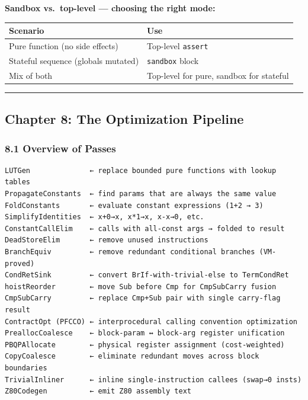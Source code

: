 \documentclass[
  11pt,
]{article}
\begin{document}
\textbf{Sandbox vs.~top-level --- choosing the right mode:}

\begin{longtable}[]{@{}ll@{}}
\toprule\noalign{}
Scenario & Use \\
\midrule\noalign{}
\endhead
\bottomrule\noalign{}
\endlastfoot
Pure function (no side effects) & Top-level \texttt{assert} \\
Stateful sequence (globals mutated) & \texttt{sandbox} block \\
Mix of both & Top-level for pure, sandbox for stateful \\
\end{longtable}

\begin{center}\rule{0.5\linewidth}{0.5pt}\end{center}

\subsection{Chapter 8: The Optimization
Pipeline}\label{chapter-8-the-optimization-pipeline}

\subsubsection{8.1 Overview of Passes}\label{overview-of-passes}

\begin{verbatim}
LUTGen              ← replace bounded pure functions with lookup tables
PropagateConstants  ← find params that are always the same value
FoldConstants       ← evaluate constant expressions (1+2 → 3)
SimplifyIdentities  ← x+0→x, x*1→x, x-x→0, etc.
ConstantCallElim    ← calls with all-const args → folded to result
DeadStoreElim       ← remove unused instructions
BranchEquiv         ← remove redundant conditional branches (VM-proved)
CondRetSink         ← convert BrIf-with-trivial-else to TermCondRet
hoistReorder        ← move Sub before Cmp for CmpSubCarry fusion
CmpSubCarry         ← replace Cmp+Sub pair with single carry-flag result
ContractOpt (PFCCO) ← interprocedural calling convention optimization
PreallocCoalesce    ← block-param ↔ block-arg register unification
PBQPAllocate        ← physical register assignment (cost-weighted)
CopyCoalesce        ← eliminate redundant moves across block boundaries
TrivialInliner      ← inline single-instruction callees (swap→0 insts)
Z80Codegen          ← emit Z80 assembly text
\end{verbatim}
\end{document}
